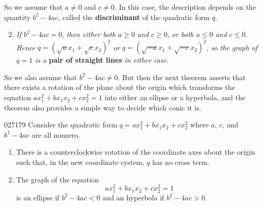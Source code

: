 \noindent So we assume that $a \neq 0$ and $c \neq 0$. In this case, the description depends on the quantity $b^{2} - 4ac$, called the \textbf{discriminant} of the quadratic form $q$.


\begin{enumerate}
\setcounter{enumi}{1}
\item \textit{If} $b^{2} - 4ac = 0$, \textit{then either both} $a \geq 0$ \textit{and} $c \geq 0$, \textit{or both} $a \leq 0$ \textit{and} $c \leq 0$. \\ \textit{Hence} $q = (\sqrt{a}x_{1} + \sqrt{c}x_{2})^2$ \textit{or} $q = (\sqrt{-a}x_{1} + \sqrt{-c}x_{2})^2$, \textit{so the graph of} $q = 1$ \textit{is a} \textbf{pair of straight lines} \textit{in either case}.
\end{enumerate}

\noindent So we also assume that $b^{2} - 4ac \neq 0$. But then the next theorem asserts that there exists a rotation of the plane about the origin which transforms the equation $ax_{1}^2 + bx_{1}x_{2} + cx_{2}^2 = 1$ into either an ellipse or a hyperbola, and the theorem also provides a simple way to decide which conic it is.


\begin{theorem}{}{027179}
Consider the quadratic form $q = ax_{1}^2 + bx_{1}x_{2} + cx_{2}^2$ where $a$, $c$, and $b^{2} - 4ac$ are all nonzero.


\begin{enumerate}
\item There is a counterclockwise rotation of the coordinate axes about the origin such that, in the new coordinate system, $q$ has no cross term.

\item The graph of the equation
\begin{equation*}
ax_{1}^2 + bx_{1}x_{2} + cx_{2}^2 = 1
\end{equation*}
is an ellipse if $b^{2} - 4ac < 0$ and an hyperbola if $b^{2} - 4ac > 0$.

\end{enumerate}
\end{theorem}

